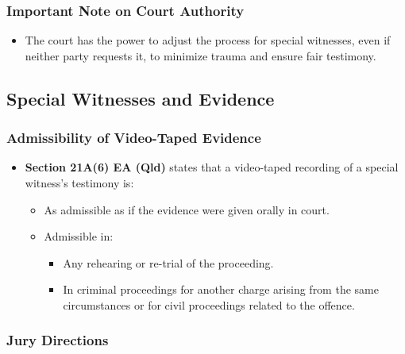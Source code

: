 \subsubsection{Important Note on Court
Authority}\label{important-note-on-court-authority}

\begin{itemize}
\tightlist
\item
  The court has the power to adjust the process for special witnesses,
  even if neither party requests it, to minimize trauma and ensure fair
  testimony.
\end{itemize}

\subsection{  Special Witnesses and
Evidence}\label{special-witnesses-and-evidence}

\subsubsection{Admissibility of Video-Taped
Evidence}\label{admissibility-of-video-taped-evidence}

\begin{itemize}
\tightlist
\item
  \textbf{Section 21A(6) EA (Qld)} states that a video-taped recording
  of a special witness's testimony is:

  \begin{itemize}
  \tightlist
  \item
    As admissible as if the evidence were given orally in court.
  \item
    Admissible in:

    \begin{itemize}
    \tightlist
    \item
      Any rehearing or re-trial of the proceeding.
    \item
      In criminal proceedings for another charge arising from the same
      circumstances or for civil proceedings related to the offence.
    \end{itemize}
  \end{itemize}
\end{itemize}

\subsubsection{Jury Directions}\label{jury-directions}

